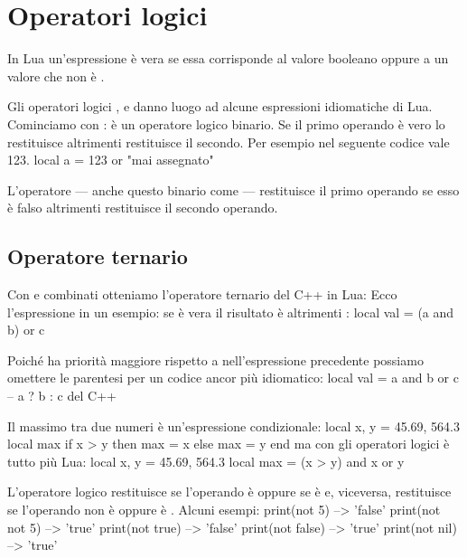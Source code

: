 

\chapter{Operatori logici}

In Lua un'espressione è vera se essa corrisponde al valore booleano 
oppure a un valore che non è .

Gli operatori logici ,  e  danno luogo ad alcune
espressioni idiomatiche di Lua. Cominciamo con : è un operatore logico
binario. Se il primo operando è vero lo restituisce altrimenti restituisce il
secondo. Per esempio nel seguente codice  vale 123.
\lines
local a = 123 or "mai assegnato"
\endlines
{}

L'operatore  --- anche questo binario come  --- restituisce il
primo operando se esso è falso altrimenti restituisce il secondo operando.

\section{Operatore ternario}
\label{secFondOperatoreTernario}

Con  e  combinati otteniamo l'operatore ternario del C++ in
Lua: Ecco l'espressione in un esempio: se  è vera il risultato è 
altrimenti :
\lines
local val = (a and b) or c
\endlines
{}

Poiché  ha priorità maggiore rispetto a  nell'espressione
precedente possiamo omettere le parentesi per un codice ancor più idiomatico:
\lines
local val = a and b or c -- a ? b : c del C++
\endlines
{}

Il massimo tra due numeri è un'espressione condizionale:
\lines
local x, y = 45.69, 564.3
local max
if x > y then
    max = x
else
    max = y
end
\endlines
{}
ma con gli operatori logici è tutto più Lua:
\lines
local x, y = 45.69, 564.3
local max = (x > y) and x or y
\endlines
{}

L'operatore logico  restituisce  se l'operando è 
oppure se è  e, viceversa, restituisce  se l'operando non
è  oppure è . Alcuni esempi:
\lines
print(not 5)       --> 'false'
print(not not 5)   --> 'true'
print(not true)    --> 'false'
print(not false)   --> 'true'
print(not nil)     --> 'true'
\endlines
{}


